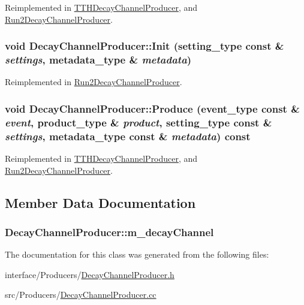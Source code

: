 Reimplemented in \hyperlink{classTTHDecayChannelProducer_aace688b4843340b15df45ba5b7481739}{TTHDecayChannelProducer}, and \hyperlink{classRun2DecayChannelProducer_a06679779125c72055f17b6459ed6cd76}{Run2DecayChannelProducer}.\hypertarget{classDecayChannelProducer_a5876d5fbfeb50e57f802d2f334a1bf4b}{
\subsubsection[{Init}]{\setlength{\rightskip}{0pt plus 5cm}void DecayChannelProducer::Init (setting\_\-type const \& {\em settings}, \/  metadata\_\-type \& {\em metadata})}}
\label{classDecayChannelProducer_a5876d5fbfeb50e57f802d2f334a1bf4b}


Reimplemented in \hyperlink{classRun2DecayChannelProducer_a882927f7f4db3244af175db88535a496}{Run2DecayChannelProducer}.\hypertarget{classDecayChannelProducer_a0e10edeaa5e3ae64023b521237f50003}{
\subsubsection[{Produce}]{\setlength{\rightskip}{0pt plus 5cm}void DecayChannelProducer::Produce (event\_\-type const \& {\em event}, \/  product\_\-type \& {\em product}, \/  setting\_\-type const \& {\em settings}, \/  metadata\_\-type const \& {\em metadata}) const}}
\label{classDecayChannelProducer_a0e10edeaa5e3ae64023b521237f50003}


Reimplemented in \hyperlink{classTTHDecayChannelProducer_a156d33176c768ffd652292bf365f73a0}{TTHDecayChannelProducer}, and \hyperlink{classRun2DecayChannelProducer_a5f16d982e94c38e4c36e97d842bee5be}{Run2DecayChannelProducer}.

\subsection{Member Data Documentation}
\hypertarget{classDecayChannelProducer_a4377dc18e06d6ddb5f7abbfb8a4b48e5}{
\subsubsection[{m\_\-decayChannel}]{ {\bf DecayChannelProducer::m\_\-decayChannel}}}
\label{classDecayChannelProducer_a4377dc18e06d6ddb5f7abbfb8a4b48e5}


The documentation for this class was generated from the following files:\begin{DoxyCompactItemize}
\item 
interface/Producers/\hyperlink{DecayChannelProducer_8h}{DecayChannelProducer.h}\item 
src/Producers/\hyperlink{DecayChannelProducer_8cc}{DecayChannelProducer.cc}\end{DoxyCompactItemize}

